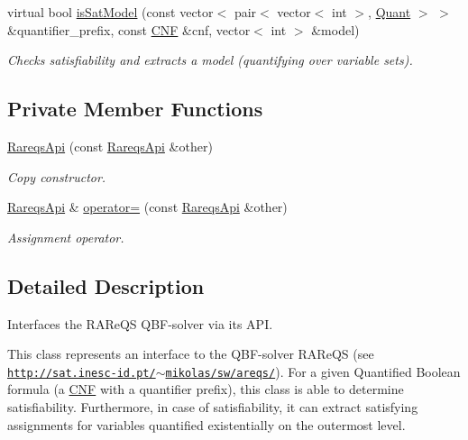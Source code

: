 \begin{DoxyCompactItemize}
virtual bool \hyperlink{classRareqsApi_a70eb2a4b5b5e5493482c6c54ea00b295}{is\-Sat\-Model} (const vector$<$ pair$<$ vector$<$ int $>$, \hyperlink{classQBFSolver_ac091e263cb55286cc07b2451bcf4d3c7}{Quant} $>$ $>$ \&quantifier\-\_\-prefix, const \hyperlink{classCNF}{C\-N\-F} \&cnf, vector$<$ int $>$ \&model)
\begin{DoxyCompactList}\small\item\em Checks satisfiability and extracts a model (quantifying over variable sets). \end{DoxyCompactList}\end{DoxyCompactItemize}
\subsection*{Private Member Functions}
\begin{DoxyCompactItemize}
\item 
\hyperlink{classRareqsApi_a7abf07d0ea8969b079883ac26e79ebce}{Rareqs\-Api} (const \hyperlink{classRareqsApi}{Rareqs\-Api} \&other)
\begin{DoxyCompactList}\small\item\em Copy constructor. \end{DoxyCompactList}\item 
\hyperlink{classRareqsApi}{Rareqs\-Api} \& \hyperlink{classRareqsApi_ad2f293116e022201865c297735b43071}{operator=} (const \hyperlink{classRareqsApi}{Rareqs\-Api} \&other)
\begin{DoxyCompactList}\small\item\em Assignment operator. \end{DoxyCompactList}\end{DoxyCompactItemize}


\subsection{Detailed Description}
Interfaces the R\-A\-Re\-Q\-S Q\-B\-F-\/solver via its A\-P\-I. 

This class represents an interface to the Q\-B\-F-\/solver R\-A\-Re\-Q\-S (see \href{http://sat.inesc-id.pt/~mikolas/sw/areqs/}{\tt http\-://sat.\-inesc-\/id.\-pt/$\sim$mikolas/sw/areqs/}). For a given Quantified Boolean formula (a \hyperlink{classCNF}{C\-N\-F} with a quantifier prefix), this class is able to determine satisfiability. Furthermore, in case of satisfiability, it can extract satisfying assignments for variables quantified existentially on the outermost level.

